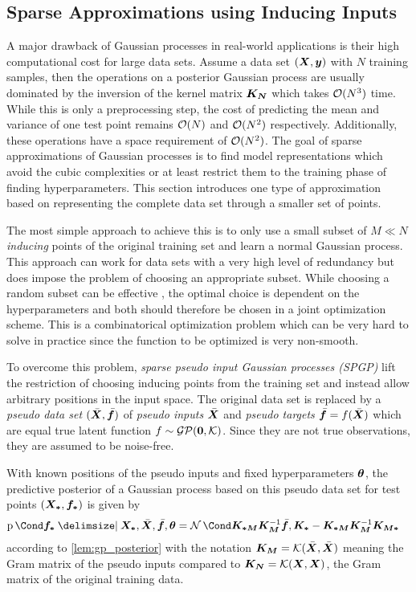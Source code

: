 \subsection{Sparse Approximations using Inducing Inputs}
A major drawback of Gaussian processes in real-world applications is their high computational cost for large data sets.
Assume a data set $(\bm{X}, \bm{y})$ with $N$ training samples, then the operations on a posterior Gaussian process are usually dominated by the inversion of the kernel matrix $\bm{K_N}$ which takes $\operatorname{\mathcal{O}}(N^3)$ time.
While this is only a preprocessing step, the cost of predicting the mean and variance of one test point remains $\operatorname{\mathcal{O}}(N)$ and $\operatorname{\mathcal{O}}(N^2)$ respectively.
Additionally, these operations have a space requirement of $\operatorname{\mathcal{O}}(N^2)$.
The goal of sparse approximations of Gaussian processes is to find model representations which avoid the cubic complexities or at least restrict them to the training phase of finding hyperparameters.
This section introduces one type of approximation based on representing the complete data set through a smaller set of points.

The most simple approach to achieve this is to only use a small subset of $M \ll N$ \emph{inducing} points of the original training set and learn a normal Gaussian process.
This approach can work for data sets with a very high level of redundancy but does impose the problem of choosing an appropriate subset.
While choosing a random subset can be effective \cite{snelson_flexible_2007}, the optimal choice is dependent on the hyperparameters and both should therefore be chosen in a joint optimization scheme.
This is a combinatorical optimization problem which can be very hard to solve in practice since the function to be optimized is very non-smooth.

To overcome this problem, \emph{sparse pseudo input Gaussian processes (SPGP)} \cite{snelson_flexible_2007} lift the restriction of choosing inducing points from the training set and instead allow arbitrary positions in the input space.
The original data set is replaced by a \emph{pseudo data set} $(\bar{\bm{X}}, \bar{\bm{f}})$ of \emph{pseudo inputs} $\bar{\bm{X}}$ and \emph{pseudo targets} $\bar{\bm{f}} = f(\bar{\bm{X}})$ which are equal true latent function $f \sim \operatorname{\mathcal{GP}}(\bm{0}, \operatorname{\mathcal{K}})$.
Since they are not true observations, they are assumed to be noise-free.

With known positions of the pseudo inputs and fixed hyperparameters $\bm{\theta}$, the predictive posterior of a Gaussian process based on this pseudo data set for test points $(\bm{X_\ast}, \bm{f_\ast})$ is given by
\begin{align}
    \Prob{\mat{f_\ast} \given \mat{X_\ast}, \ps{\mat{X}}, \ps{\mat{f}}, \mat{\theta}} &= \Gaussian{\mat{K_{\ast M}}\mat{K_M}^{-1} \ps{\mat{f}}, \mat{K_\ast} - \mat{K_{\ast M}} \mat{K_M}^{-1} \mat{K_{M \ast}}}
\end{align}
according to \cref{lem:gp_posterior} with the notation $\bm{K_M} = \operatorname{\mathcal{K}}(\bar{\bm{X}}, \bar{\bm{X}})$ meaning the Gram matrix of the pseudo inputs compared to $\bm{K_N} = \operatorname{\mathcal{K}}(\bm{X}, \bm{X})$, the Gram matrix of the original training data.

